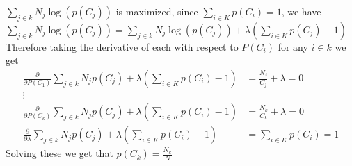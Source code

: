 \documentclass[12pt]{article}
\begin{document}
$\sum_{j \in k} N_j\log(p(C_j))$ is maximized, since $\sum_{i\in K}p(C_i)=1$, we have $\sum_{j \in k} N_j\log(p(C_j))=\sum_{j \in k} N_j\log(p(C_j))+\lambda(\sum_{i\in K}p(C_j)-1)$
Therefore taking the derivative of each with respect to $P(C_i)$ for any $i\in k$ we get
\begin{align*}
    \frac{\partial }{\partial P(C_1)}\sum_{j \in k} N_jp(C_j)+\lambda(\sum_{i\in K}p(C_i)-1)&=\frac{N_j}{C_j}+\lambda=0\\
    \vdots \\
    \frac{\partial }{\partial P(C_k)}\sum_{j \in k} N_jp(C_j)+\lambda(\sum_{i\in K}p(C_i)-1)&=\frac{N_k}{C_k}+\lambda=0\\
    \frac{\partial }{\partial \lambda}\sum_{j \in k} N_jp(C_j)+\lambda(\sum_{i\in K}p(C_i)-1)&=\sum_{i\in K}p(C_i)=1
\end{align*}
Solving these we get that $p(C_k)=\boxed{\frac{N_k}{N}}$
\end{document}

